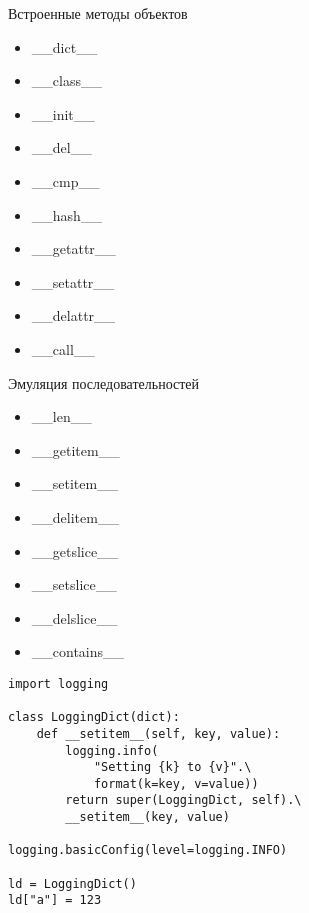 \documentclass[hyperref={pdftex,unicode}]{beamer}
\begin{document}
\begin{frame}{Встроенные методы объектов}
  \begin{itemize}
  \item \_\_dict\_\_
  \item \_\_class\_\_
  \item \_\_init\_\_
  \item \_\_del\_\_
  \item \_\_cmp\_\_
  \item \_\_hash\_\_
  \item \_\_getattr\_\_
  \item \_\_setattr\_\_
  \item \_\_delattr\_\_
  \item \_\_call\_\_
  \end{itemize}
\end{frame}

\begin{frame}[fragile]{Эмуляция последовательностей}
  \begin{minipage}{0.3\linewidth}
    \begin{itemize}
    \item \_\_len\_\_
    \item \_\_getitem\_\_
    \item \_\_setitem\_\_
    \item \_\_delitem\_\_
    \item \_\_getslice\_\_
    \item \_\_setslice\_\_
    \item \_\_delslice\_\_
    \item \_\_contains\_\_
    \end{itemize}
  \end{minipage}
  \hfill
  \begin{minipage}{0.65\linewidth}
    \begin{lstlisting}[basicstyle=\scriptsize\ttfamily]
import logging

class LoggingDict(dict):
    def __setitem__(self, key, value):
        logging.info(
            "Setting {k} to {v}".\
            format(k=key, v=value))
        return super(LoggingDict, self).\
        __setitem__(key, value)

logging.basicConfig(level=logging.INFO)

ld = LoggingDict()
ld["a"] = 123
      \end{lstlisting}
  \end{minipage}
\end{frame}
\end{document}
